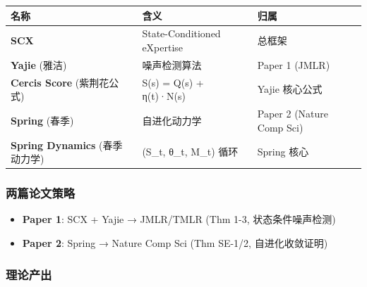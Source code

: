 \documentclass[
  12pt,
]{ctexart}
\providecommand{\tightlist}{%
  \setlength{\itemsep}{0pt}\setlength{\parskip}{0pt}}
\begin{document}
\begin{longtable}[]{@{}
  >{\raggedright\arraybackslash}p{}
  >{\raggedright\arraybackslash}p{}
  >{\raggedright\arraybackslash}p{}@{}}
\toprule\noalign{}
\begin{minipage}[b]{\linewidth}\raggedright
名称
\end{minipage} & \begin{minipage}[b]{\linewidth}\raggedright
含义
\end{minipage} & \begin{minipage}[b]{\linewidth}\raggedright
归属
\end{minipage} \\
\midrule\noalign{}
\endhead
\bottomrule\noalign{}
\endlastfoot
\textbf{SCX} & State-Conditioned eXpertise & 总框架 \\
\textbf{Yajie} (雅洁) & 噪声检测算法 & Paper 1 (JMLR) \\
\textbf{Cercis Score} (紫荆花公式) & S(s) = Q(s) + η(t)·N(s) & Yajie
核心公式 \\
\textbf{Spring} (春季) & 自进化动力学 & Paper 2 (Nature Comp Sci) \\
\textbf{Spring Dynamics} (春季动力学) & (S\_t, θ\_t, M\_t) 循环 & Spring
核心 \\
\end{longtable}

\subsubsection{两篇论文策略}\label{ux4e24ux7bc7ux8bbaux6587ux7b56ux7565}

\begin{itemize}
\tightlist
\item
  \textbf{Paper 1}: SCX + Yajie → JMLR/TMLR (Thm 1-3, 状态条件噪声检测)
\item
  \textbf{Paper 2}: Spring → Nature Comp Sci (Thm SE-1/2,
  自进化收敛证明)
\end{itemize}

\subsubsection{理论产出}\label{ux7406ux8bbaux4ea7ux51fa}
\end{document}
